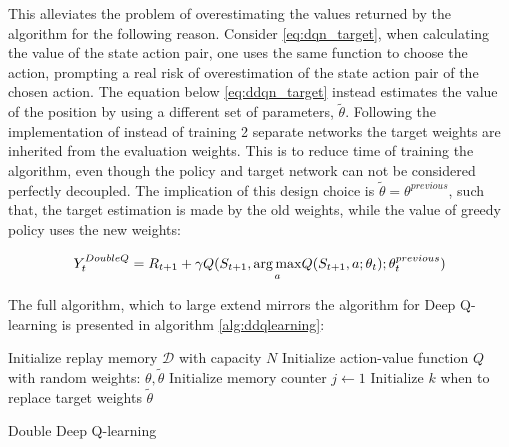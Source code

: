 This alleviates the problem of overestimating the values returned by the algorithm for the following reason. Consider \eqref{eq:dqn_target}, when calculating the value of the state action pair, one uses the same function to choose the action, prompting  a real risk of overestimation of the state action pair of the chosen action. The equation below \eqref{eq:ddqn_target} instead estimates the value of the position by using a different set of parameters, $\tilde{\theta}$. Following the implementation of \textcite{van_hasselt_deep_2015} instead of training 2 separate networks the target weights are inherited from the evaluation weights. This is to reduce time of training the algorithm, even though the policy and target network can not be considered perfectly decoupled. The implication of this design choice is $\tilde{\theta} = \theta^{previous}$, such that, the target estimation is made by the old weights, while the value of greedy policy uses the new weights:

\begin{equation}\label{eq:ddqn_target_final}
    Y_t^{DoubleQ} = R_{t+1} + \gamma Q(S_{t+1}, \underset{a}{\operatorname*{arg\,max}}Q(S_{t+1}, a; \theta_t); \theta_t^{previous}) 
\end{equation}

The full algorithm, which to large extend mirrors the algorithm for Deep Q-learning is presented in algorithm \ref{alg:ddqlearning}:

\begin{algorithm}[H]
\SetAlgoLined
 Initialize replay memory $\mathcal{D}$ with capacity $N$\;
 Initialize action-value function $Q$ with random weights: $\theta, \tilde{\theta}$\;
 Initialize memory counter $j \leftarrow 1$\;
 Initialize $k$ when to replace target weights $\tilde{\theta}$\;
\caption{Double Deep Q-learning}
\label{alg:ddqlearning}
\end{algorithm}

